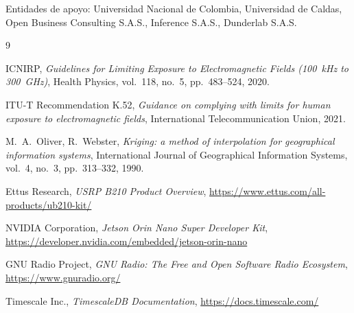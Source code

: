 \documentclass[12pt,a4paper]{article}
\begin{document}
Entidades de apoyo: Universidad Nacional de Colombia, Universidad de Caldas, Open Business Consulting S.A.S., Inference S.A.S., Dunderlab S.A.S.

\begin{thebibliography}{9}

ICNIRP,
\textit{Guidelines for Limiting Exposure to Electromagnetic Fields (100~kHz to 300~GHz)},
Health Physics, vol.~118, no.~5, pp.~483--524, 2020.

ITU-T Recommendation K.52,
\textit{Guidance on complying with limits for human exposure to electromagnetic fields},
International Telecommunication Union, 2021.

M.~A.~Oliver, R.~Webster,
\textit{Kriging: a method of interpolation for geographical information systems},
International Journal of Geographical Information Systems, vol.~4, no.~3, pp.~313--332, 1990.

Ettus Research,
\textit{USRP B210 Product Overview},
\url{https://www.ettus.com/all-products/ub210-kit/}

NVIDIA Corporation,
\textit{Jetson Orin Nano Super Developer Kit},
\url{https://developer.nvidia.com/embedded/jetson-orin-nano}

GNU Radio Project,
\textit{GNU Radio: The Free and Open Software Radio Ecosystem},
\url{https://www.gnuradio.org/}

Timescale Inc.,
\textit{TimescaleDB Documentation},
\url{https://docs.timescale.com/}

\end{thebibliography}
\end{document}
